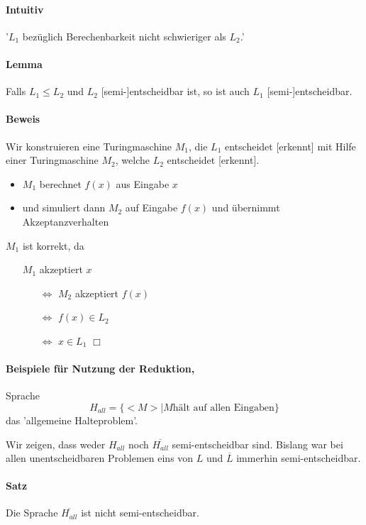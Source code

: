 \paragraph*{Intuitiv} '$L_1$ bezüglich Berechenbarkeit nicht schwieriger als $L_2$.'

\paragraph*{Lemma} Falls $L_1 \leq L_2$ und $L_2$ [semi-]entscheidbar ist, so ist auch $L_1$ [semi-]entscheidbar.

\paragraph*{Beweis} Wir konstruieren eine Turingmaschine $M_1$, die $L_1$ entscheidet [erkennt] mit Hilfe einer Turingmaschine $M_2$, welche $L_2$ entscheidet [erkennt].
\begin{itemize}
	\item $M_1$ berechnet $f(x)$ aus Eingabe $x$
	\item und simuliert dann $M_2$ auf Eingabe $f(x)$ und übernimmt Akzeptanzverhalten
\end{itemize}
$M_1$ ist korrekt, da
\begin{itemize}
	\item[] $M_1$ akzeptiert $x$
	\begin{itemize}
		\item[$\Leftrightarrow$] $M_2$ akzeptiert $f(x)$
		\item[$\Leftrightarrow$] $f(x) \in L_2$
		\item[$\Leftrightarrow$] $x \in L_1$ $\Box$
	\end{itemize}
\end{itemize}

\paragraph*{Beispiele für Nutzung der Reduktion,} Sprache $$ H_{all} = \{ <M>|M \text{hält auf allen Eingaben} \} $$ das 'allgemeine Halteproblem'.

\par\medskip Wir zeigen, dass weder $H_{all}$ noch $\overline{H_{all}}$ semi-entscheidbar sind. Bislang war bei allen unentscheidbaren Problemen eins von $L$ und $\overline{L}$ immerhin semi-entscheidbar.

\paragraph*{Satz} Die Sprache $\overline{H_{all}}$ ist nicht semi-entscheidbar.

